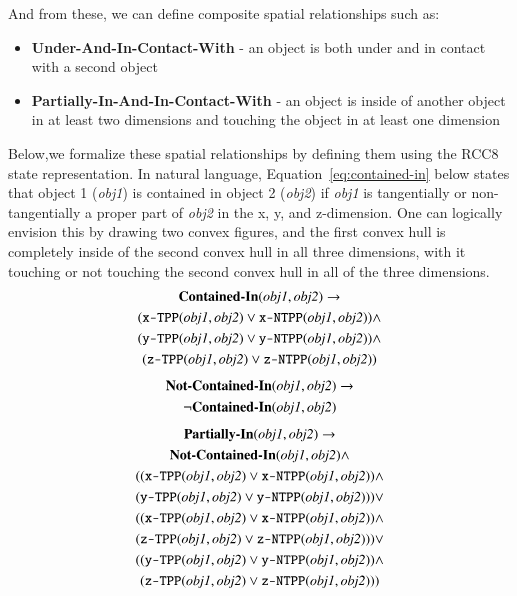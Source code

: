 \documentclass[final,1p,times]{elsarticle}
\newcommand{\obj}[1] {\textit{#1}}
\newcommand{\sr}[1] {\textbf{#1}}
\begin{document}
And from these, we can define composite spatial relationships such as:
\begin{itemize}
  \item \sr{Under-And-In-Contact-With} - an object is both under and in contact with a second object
  \item \sr{Partially-In-And-In-Contact-With} - an object is inside of another object in at least two dimensions and touching the object in at least one dimension
\end{itemize}
Below,we formalize these spatial relationships by defining them using the RCC8 state representation. In natural language, Equation~\ref{eq:contained-in} below states that object 1 (\obj{obj1}) is contained in object 2 (\obj{obj2}) if \obj{obj1} is tangentially or non-tangentially a proper part of \obj{obj2} in the x, y, and z-dimension. One can logically envision this by drawing two convex figures, and the first convex hull is completely inside of the second convex hull in all three dimensions, with it touching or not touching the second convex hull in all of the three dimensions.
\begin{gather}
\label{eq:contained-in}
\textbf{Contained-In}(\textit{obj1}, \textit{obj2}) \rightarrow  \\
(\texttt{x-TPP}(\textit{obj1}, \textit{obj2}) \vee \texttt{x-NTPP}(\textit{obj1}, \textit{obj2})) \wedge \notag\\
(\texttt{y-TPP}(\textit{obj1}, \textit{obj2}) \vee \texttt{y-NTPP}(\textit{obj1}, \textit{obj2})) \wedge \notag\\
(\texttt{z-TPP}(\textit{obj1}, \textit{obj2}) \vee \texttt{z-NTPP}(\textit{obj1}, \textit{obj2}))\notag
\end{gather}
\begin{gather}
\label{eq:not-contained-in}
\textbf{Not-Contained-In}(\textit{obj1}, \textit{obj2}) \rightarrow\\
\neg \textbf{Contained-In}(\textit{obj1}, \textit{obj2}) \notag
\end{gather}
\begin{gather}
\label{eq:partially-in}
\textbf{Partially-In}(\textit{obj1}, \textit{obj2}) \rightarrow \\
\textbf{Not-Contained-In}(\textit{obj1}, \textit{obj2}) \wedge \notag\\
((\texttt{x-TPP}(\textit{obj1}, \textit{obj2}) \vee \texttt{x-NTPP}(\textit{obj1}, \textit{obj2})) \wedge  \notag\\
(\texttt{y-TPP}(\textit{obj1}, \textit{obj2}) \vee \texttt{y-NTPP}(\textit{obj1}, \textit{obj2}))) \vee  \notag\\
((\texttt{x-TPP}(\textit{obj1}, \textit{obj2}) \vee \texttt{x-NTPP}(\textit{obj1}, \textit{obj2})) \wedge  \notag\\
(\texttt{z-TPP}(\textit{obj1}, \textit{obj2}) \vee \texttt{z-NTPP}(\textit{obj1}, \textit{obj2}))) \vee  \notag\\
((\texttt{y-TPP}(\textit{obj1}, \textit{obj2}) \vee \texttt{y-NTPP}(\textit{obj1}, \textit{obj2})) \wedge  \notag\\
(\texttt{z-TPP}(\textit{obj1}, \textit{obj2}) \vee \texttt{z-NTPP}(\textit{obj1}, \textit{obj2}))) \notag
\end{gather}
\end{document}
